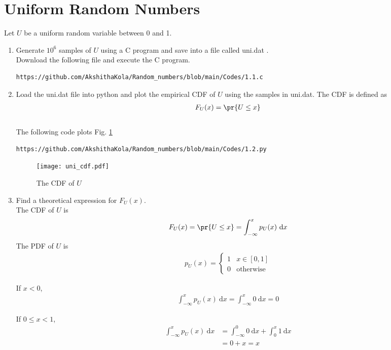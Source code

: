 \documentclass[journal,12pt,twocolumn]{IEEEtran}
\renewcommand\thesection{\arabic{section}}
\begin{document}
\section{Uniform Random Numbers}
Let $U$ be a uniform random variable between 0 and 1.
\begin{enumerate}[label=\thesection.\arabic*
,ref=\thesection.\theenumi]
\item Generate $10^6$ samples of $U$ using a C program and save into a file called uni.dat .
\\
\solution Download the following file and execute the  C program.
\begin{lstlisting}
https://github.com/AkshithaKola/Random_numbers/blob/main/Codes/1.1.c
\end{lstlisting}
%
\item
Load the uni.dat file into python and plot the empirical CDF of $U$ using the samples in uni.dat. The CDF is defined as
\begin{align}
F_{U}(x) = \pr{U \le x}
\end{align}
\\
\solution  The following code plots Fig. \ref{fig:uni_cdf}
\begin{lstlisting}
https://github.com/AkshithaKola/Random_numbers/blob/main/Codes/1.2.py
\end{lstlisting}
\begin{figure}
\centering
\texttt{[image: uni\_cdf.pdf]}
\caption{The CDF of $U$}
\label{fig:uni_cdf}
\end{figure}
%
\item
Find a  theoretical expression for $F_{U}(x)$. \\
\solution 	The CDF of $U$ is 
	\begin{align}
		F_{U}(x) = \pr{U \le x} = \int_{-\infty}^x p_{U}(x) ~\mathrm{d}x
	\end{align}
	The PDF of $U$ is 
	\begin{align}
		p_{U}(x) = 
		\begin{cases}
			1 & x \in [0, 1] \\
			0 & \text{otherwise}
		\end{cases}
	\end{align}
	
	If $x<0$,
	\begin{align}
		\int_{-\infty}^x p_{U}(x) ~\mathrm{d}x = \int_{-\infty}^x 0 ~\mathrm{d}x = 0
	\end{align}
	
	If $0\leq x<1$,
	\begin{align}
		\int_{-\infty}^x p_{U}(x) ~\mathrm{d}x &= \int_{-\infty}^0 0 ~\mathrm{d}x + \int_0^x 1 ~\mathrm{d}x \\
		&= 0 + x = x\\
	\end{align}
	

\end{enumerate}
\end{document}
